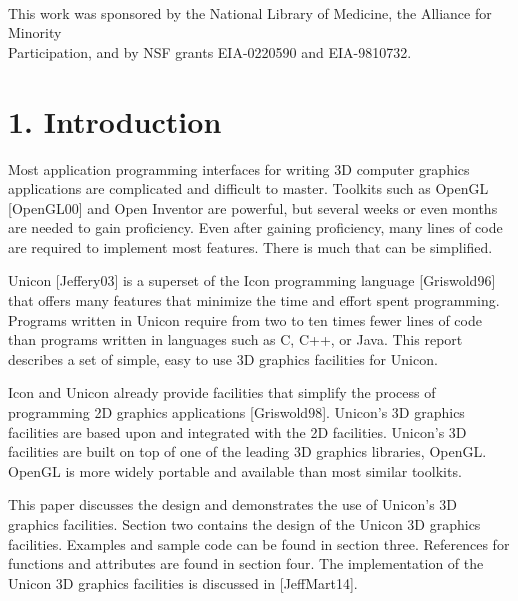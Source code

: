 \documentclass[letterpaper]{article}
\begin{document}
\ \\

\bigskip

\bigskip

\bigskip

\bigskip

\bigskip

\bigskip

{
This work was sponsored by the National Library of Medicine, the
Alliance for Minority\\ Participation, and by NSF grants
EIA-0220590 and EIA-9810732.}

\pagebreak

\section[1. Introduction]{1. Introduction}

\bigskip

Most application programming interfaces for writing 3D computer
graphics applications are complicated and difficult to
master. Toolkits such as OpenGL [OpenGL00] and Open Inventor are
powerful, but several weeks or even months are needed to gain
proficiency. Even after gaining proficiency, many lines of code are
required to implement most features. There is much that can be
simplified.

Unicon [Jeffery03] is a superset of the Icon programming language
[Griswold96] that offers many features that minimize the time and
effort spent programming. Programs written in Unicon require from two
to ten times fewer lines of code than programs written in languages
such as C, C++, or Java. This report describes a set of simple, easy
to use 3D graphics facilities for Unicon.

Icon and Unicon already provide facilities that simplify the process
of programming 2D graphics applications [Griswold98]. Unicon's 3D
graphics facilities are based upon and integrated with the 2D
facilities. Unicon's 3D facilities are built on top of one of the
leading 3D graphics libraries, OpenGL. OpenGL is more widely portable
and available than most similar toolkits.

This paper discusses the design and demonstrates the use of Unicon's
3D graphics facilities. Section two contains the design of the Unicon
3D graphics facilities. Examples and sample code can be found in
section three. References for functions and attributes are found in
section four. The implementation of the Unicon 3D graphics facilities
is discussed in [JeffMart14].
\end{document}
